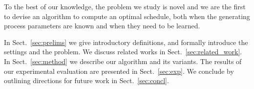To the best of our knowledge, the problem we study is novel and we are the first
to devise an algorithm to compute an optimal schedule, both when the generating
process parameters are known and when they need to be learned. 

 In Sect.~\ref{sec:prelims} we give introductory
definitions, and formally introduce the settings and the problem. We discuss
related works in Sect.~\ref{sec:related_work}. In Sect.~\ref{sec:method} we
describe our algorithm \algoname and its variants. The results of our
experimental evaluation are presented in Sect.~\ref{sec:exp}. We conclude by
outlining directions for future work in Sect.~\ref{sec:concl}.
